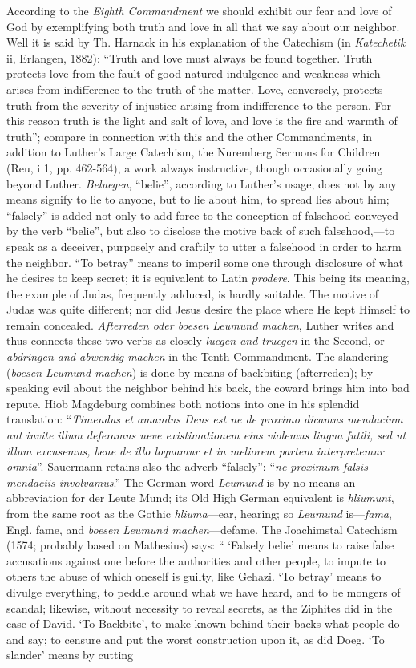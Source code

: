 According to the \emph{Eighth Commandment} we should exhibit our fear and love of God by exemplifying both truth and love in all that we say about our neighbor. Well it is said by Th. Harnack in his explanation of the Catechism (in \emph{Katechetik} ii, Erlangen, 1882): “Truth and love must always be found together. Truth protects love from the fault of good-natured indulgence and weakness which arises from indifference to the truth of the matter. Love, conversely, protects truth from the severity of injustice arising from indifference to the person. For this reason truth is the light and salt of love, and love is the fire and warmth of truth”; compare in connection with this and the other Commandments, in addition to Luther’s Large Catechism, the Nuremberg Sermons for Children (Reu, i 1, pp. 462-564), a work always
instructive, though occasionally going beyond Luther. \emph{Beluegen}, “belie”, according to Luther’s usage, does not by any means signify to lie to anyone, but to lie about him, to spread lies about him; “falsely” is added not only to add force to the conception of falsehood conveyed by the verb “belie”, but also to disclose the motive back of such falsehood,—to speak as a deceiver, purposely and craftily to utter a falsehood in order to harm the neighbor. “To betray” means to imperil some one through disclosure of what he desires to keep secret; it is equivalent to Latin \emph{prodere}. This being its meaning, the example of Judas, frequently adduced, is hardly suitable. The motive of Judas was quite different; nor did Jesus desire the place where He kept Himself to remain concealed. \emph{Afterreden oder boesen Leumund machen}, Luther writes and thus connects these two verbs as closely \emph{luegen and truegen} in the Second, or \emph{abdringen and abwendig machen} in the Tenth Commandment. The slandering (\emph{boesen Leumund machen}) is done by means of backbiting (afterreden); by speaking evil about the neighbor behind his back, the coward brings him into bad repute. Hiob Magdeburg combines both notions into one in his splendid translation: “\emph{Timendus et amandus Deus est ne de proximo dicamus mendacium aut invite illum deferamus neve existimationem eius violemus lingua futili, sed ut illum excusemus, bene de illo loquamur et in meliorem partem interpretemur omnia}”. Sauermann retains also the adverb “falsely”: “\emph{ne proximum falsis mendaciis involvamus}.” The German word \emph{Leumund} is by no means an abbreviation for der Leute Mund; its Old High German equivalent is \emph{hliumunt}, from the same root as the Gothic \emph{hliuma}—ear, hearing; so \emph{Leumund} is—\emph{fama}, Engl. fame, and \emph{boesen Leumund machen}—defame. The Joachimstal Catechism (1574; probably based on Mathesius) says: “ ‘Falsely belie’ means to raise false accusations against one before the authorities and other people, to impute to others the abuse of which oneself is guilty, like Gehazi. ‘To betray’ means to divulge everything, to peddle around what we have heard, and to be mongers of scandal; likewise, without necessity to reveal secrets, as the Ziphites did in the case of David. ‘To Backbite’, to make known behind their backs what people do and say; to censure and put the worst construction upon it, as did Doeg. ‘To slander’ means by cutting 